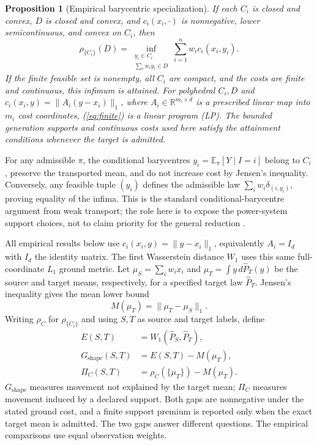 \documentclass[journal]{IEEEtran}
\newtheorem{proposition}{Proposition}
\newcommand{\R}{\mathbb{R}}
\begin{document}
\begin{proposition}[Empirical barycentric specialization]
If each $C_i$ is closed and convex, $D$ is closed and convex, and $c_i(x_i,\cdot)$ is nonnegative, lower semicontinuous, and convex on $C_i$, then
\begin{equation}
\rho_{\{C_i\}}(D)=\inf_{\substack{y_i\in C_i\\ \sum_iw_iy_i\in D}}\sum_{i=1}^{n}w_i c_i(x_i,y_i).
\label{eq:finite}
\end{equation}
If the finite feasible set is nonempty, all $C_i$ are compact, and the costs are finite and continuous, this infimum is attained. For polyhedral $C_i,D$ and $c_i(x_i,y)=\|A_i(y-x_i)\|_1$, where $A_i\in\R^{m_i\times d}$ is a prescribed linear map into $m_i$ cost coordinates, (\ref{eq:finite}) is a linear program (LP). The bounded generation supports and continuous costs used here satisfy the attainment conditions whenever the target is admitted.
\end{proposition}
For any admissible $\pi$, the conditional barycentres $y_i=\mathbb E_\pi[Y\mid I=i]$ belong to $C_i$, preserve the transported mean, and do not increase cost by Jensen's inequality. Conversely, any feasible tuple $(y_i)$ defines the admissible law $\sum_iw_i\delta_{(i,y_i)}$, proving equality of the infima. This is the standard conditional-barycentre argument from weak transport; the role here is to expose the power-system support choices, not to claim priority for the general reduction \cite{Gozlan2017,Backhoff2019}.

All empirical results below use $c_i(x_i,y)=\|y-x_i\|_1$, equivalently $A_i=I_d$ with $I_d$ the identity matrix. The first Wasserstein distance $W_1$ uses this same full-coordinate $L_1$ ground metric. Let $\mu_S=\sum_iw_ix_i$ and $\mu_T=\int y\,d\widehat P_T(y)$ be the source and target means, respectively, for a specified target law $\widehat P_T$. Jensen's inequality gives the mean lower bound
\begin{equation}
M(\mu_T)=\|\mu_T-\mu_S\|_1.
\label{eq:mean}
\end{equation}
Writing $\rho_C$ for $\rho_{\{C_i\}}$ and using $S,T$ as source and target labels, define
\begin{align}
E(S,T)&=W_1(\widehat P_S,\widehat P_T),\\
G_{\mathrm{shape}}(S,T)&=E(S,T)-M(\mu_T),\\
\Pi_C(S,T)&=\rho_C(\{\mu_T\})-M(\mu_T).
\label{eq:gaps}
\end{align}
$G_{\mathrm{shape}}$ measures movement not explained by the target mean; $\Pi_C$ measures movement induced by a declared support. Both gaps are nonnegative under the stated ground cost, and a finite support premium is reported only when the exact target mean is admitted. The two gaps answer different questions. The empirical comparisons use equal observation weights.
\end{document}
